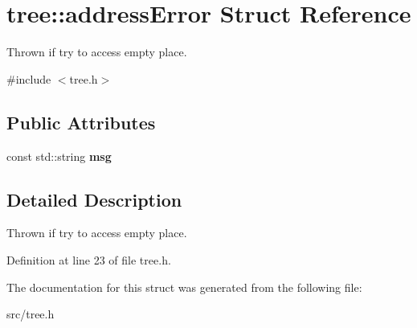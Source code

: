 \hypertarget{structtree_1_1addressError}{\section{tree\-:\-:address\-Error Struct Reference}
\label{structtree_1_1addressError}
}


Thrown if try to access empty place.  




{\ttfamily \#include $<$tree.\-h$>$}

\subsection*{Public Attributes}
\begin{DoxyCompactItemize}
\item 
\hypertarget{structtree_1_1addressError_aa67327caf7001830179fb8927b511d88}{const std\-::string {\bfseries msg}}\label{structtree_1_1addressError_aa67327caf7001830179fb8927b511d88}

\end{DoxyCompactItemize}


\subsection{Detailed Description}
Thrown if try to access empty place. 

Definition at line 23 of file tree.\-h.



The documentation for this struct was generated from the following file\-:\begin{DoxyCompactItemize}
\item 
src/tree.\-h\end{DoxyCompactItemize}
